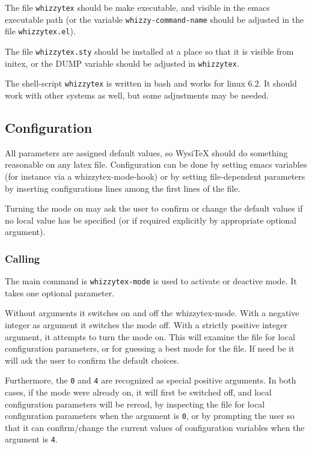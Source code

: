 \documentclass{article}
\let \lst \verb
\let \whizzy \WhizzyTeX
\begin{document}
The file \lst"whizzytex" should be make executable, and visible in the emacs
executable path (or the variable \lst"whizzy-command-name" should be
adjusted in the file \lst"whizzytex.el"). 

The file \lst"whizzytex.sty" should be installed at a place so that it is
visible  from initex, or the DUMP variable should be adjusted in
\lst"whizzytex".  

The shell-script \lst"whizzytex" is written in bash and works for linux 6.2. 
It should work with other systems as well, but some adjustments may be
needed.

\subsection {Configuration} 

All parameters are assigned default values, so WysiTeX should do something
reasonable on any latex file.
Configuration can be done by setting emacs variables (for instance via a
whizzytex-mode-hook) or by setting file-dependent parameters by 
inserting configurations lines among the first lines of the file.

Turning the {\whizzy} mode on may ask the user to confirm or change the
default values if no local value has be specified (or if required explicitly
by appropriate optional argument).


\subsubsection {Calling {\whizzy}}

The main command is \lst"whizzytex-mode" is used to activate or deactive 
{\whizzy} mode. It takes one optional parameter. 

Without arguments it switches on and off the whizzytex-mode. With a negative
integer as argument it switches the mode off. With a strictly positive
integer argument, it attempts to turn the mode on.  This will examine the
file for local configuration parameters, or for guessing a best mode for the
file. If need be it will ask the user to confirm the default choices.

Furthermore, the \lst"0" and \lst"4" are recognized as special positive
arguments. In both cases, if the mode were already on, it will first be
switched off, and local configuration parameters will be reread, by
inspecting the file for local configuration parameters when the argument is
\lst"0", or by prompting the user so that it can confirm/change the current
values of configuration variables when the argument is \lst"4".
\end{document}
